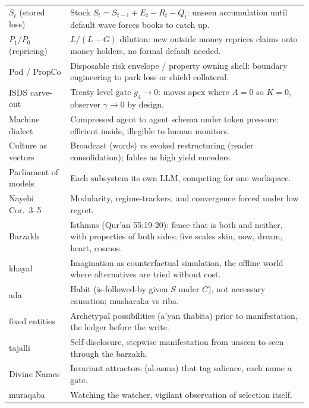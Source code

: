 \documentclass[11pt]{article}
\begin{document}
\begin{center}
\begin{tabular}{p{2.8cm}p{8.8cm}}
$S_t$ (stored loss) & Stock $S_t=S_{t-1}+E_t-R_t-Q_t$: unseen accumulation until default wave forces books to catch up. \\
$P_1/P_0$ (repricing) & $L/(L-G)$ dilution: new outside money reprices claims onto money holders, no formal default needed. \\
Pod / PropCo & Disposable risk envelope / property owning shell: boundary engineering to park loss or shield collateral. \\
ISDS carve-out & Treaty level gate $g_4\to0$: moves apex where $A=0$ so $K=0$, observer $\gamma\to0$ by design. \\
Machine dialect & Compressed agent to agent schema under token pressure: efficient inside, illegible to human monitors. \\
Culture as vectors & Broadcast (words) vs evoked restructuring (reader consolidation); fables as high yield encoders. \\
Parliament of models & Each subsystem its own LLM, competing for one workspace. \\
Nayebi Cor.\ 3--5 & Modularity, regime-trackers, and convergence forced under low regret. \\
Barzakh & Isthmus (Qur'an 55:19-20): fence that is both and neither, with properties of both sides; five scales skin, now, dream, heart, cosmos. \\
khayal & Imagination as counterfactual simulation, the offline world where alternatives are tried without cost. \\
ada & Habit (is-followed-by given $S$ under $C$), not necessary causation; musharaka vs riba. \\
fixed entities & Archetypal possibilities (a'yan thabita) prior to manifestation, the ledger before the write. \\
tajalli & Self-disclosure, stepwise manifestation from unseen to seen through the barzakh. \\
Divine Names & Invariant attractors (al-asma) that tag salience, each name a gate. \\
muraqaba & Watching the watcher, vigilant observation of selection itself. \\
\bottomrule
\end{tabular}
\end{center}
\end{document}
